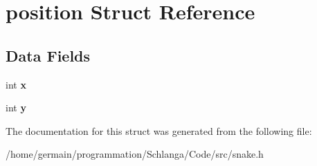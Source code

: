 \hypertarget{structposition}{\section{position Struct Reference}
\label{structposition}
}
\subsection*{Data Fields}
\begin{DoxyCompactItemize}
\item 
\hypertarget{structposition_a6150e0515f7202e2fb518f7206ed97dc}{int {\bfseries x}}\label{structposition_a6150e0515f7202e2fb518f7206ed97dc}

\item 
\hypertarget{structposition_a0a2f84ed7838f07779ae24c5a9086d33}{int {\bfseries y}}\label{structposition_a0a2f84ed7838f07779ae24c5a9086d33}

\end{DoxyCompactItemize}


The documentation for this struct was generated from the following file\-:\begin{DoxyCompactItemize}
\item 
/home/germain/programmation/\-Schlanga/\-Code/src/snake.\-h\end{DoxyCompactItemize}
